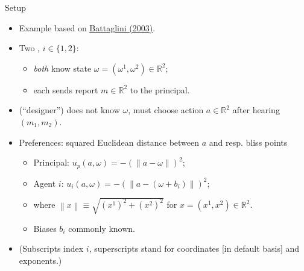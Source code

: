 \documentclass[english,10pt
,aspectratio=169
]{beamer}
\begin{document}
\begin{frame}{Setup}
\begin{itemize}
	\item Example based on \href{https://onlinelibrary.wiley.com/doi/abs/10.1111/1468-0262.00336}{\uline{Battaglini (2003)}}.
	\item Two , $i \in \{1,2\}$:
	\begin{itemize}
		\item \emph{both} know \alert{state} $\omega = (\omega^1,\omega^2) \in \mathbb{R}^2$;
		\item each sends \alert{report} $m \in \mathbb{R}^2$ to the principal.
	\end{itemize}
	\item {} (``designer'') does not know $\omega$, must choose action $a \in \mathbb{R}^2$ after hearing $(m_1,m_2)$.
	\item Preferences: squared Euclidean distance between $a$ and resp. \alert{bliss points}
	\begin{itemize}
		\item Principal: $u_p (a,\omega) = -\left(\left\|a-\omega\right\| \right)^2$;
		\item Agent $i$: $u_i (a,\omega) = -\left(\left\|a-(\omega+b_i)\right\| \right)^2$;
		\item where $\left\|x\right\| \equiv \sqrt{(x^1)^2 + (x^2)^2}$ for $x = (x^1,x^2) \in \mathbb{R}^2$.
		\item \alert{Biases} $b_i$ commonly known.
	\end{itemize}
	\item (Subscripts index $i$, superscripts stand for coordinates [in default basis] and exponents.)
\end{itemize}
\end{frame}
\end{document}
